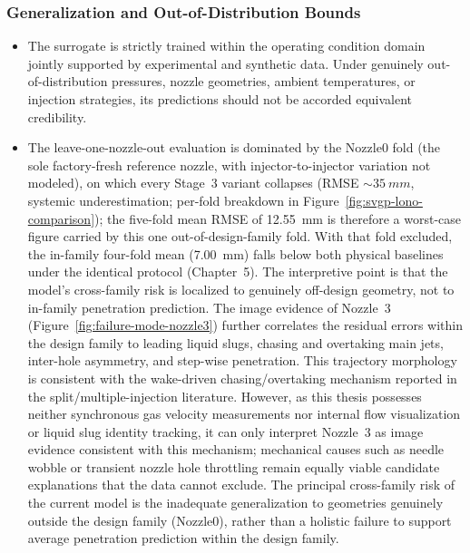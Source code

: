 \subsubsection*{Generalization and Out-of-Distribution Bounds}
\begin{itemize}
	\item The surrogate is strictly trained within the operating condition domain jointly supported by experimental and synthetic data.
	      Under genuinely out-of-distribution pressures, nozzle geometries, ambient temperatures, or injection strategies, its predictions should not be accorded equivalent credibility.

	\item The leave-one-nozzle-out evaluation is dominated by the Nozzle0 fold (the sole factory-fresh reference nozzle, with injector-to-injector variation not modeled), on which every Stage~3 variant collapses (RMSE \(\sim\SI{35}{mm}\), systemic underestimation; per-fold breakdown in Figure~\ref{fig:svgp-lono-comparison}); the five-fold mean RMSE of \SI{12.55}{mm} is therefore a worst-case figure carried by this one out-of-design-family fold.
	      With that fold excluded, the in-family four-fold mean (\SI{7.00}{mm}) falls below both physical baselines under the identical protocol (Chapter~5). The interpretive point is that the model's cross-family risk is localized to genuinely off-design geometry, not to in-family penetration prediction.
	      The image evidence of Nozzle~3 (Figure~\ref{fig:failure-mode-nozzle3}) further correlates the residual errors within the design family to leading liquid slugs, chasing and overtaking main jets, inter-hole asymmetry, and step-wise penetration. This trajectory morphology is consistent with the wake-driven chasing/overtaking mechanism reported in the split/multiple-injection literature.
	      However, as this thesis possesses neither synchronous gas velocity measurements nor internal flow visualization or liquid slug identity tracking, it can only interpret Nozzle~3 as image evidence consistent with this mechanism; mechanical causes such as needle wobble or transient nozzle hole throttling remain equally viable candidate explanations that the data cannot exclude.
	      The principal cross-family risk of the current model is the inadequate generalization to geometries genuinely outside the design family (Nozzle0), rather than a holistic failure to support average penetration prediction within the design family.
\end{itemize}

